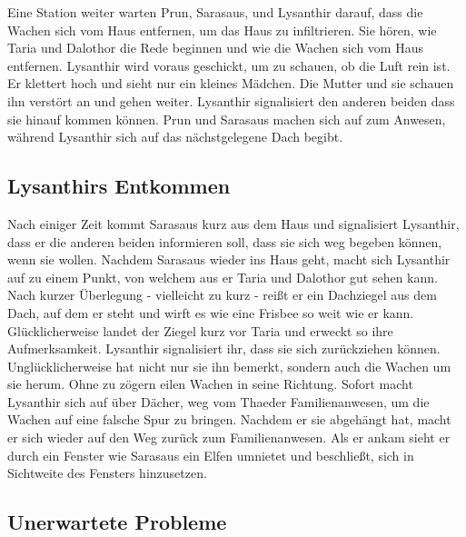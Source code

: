 \documentclass[10pt,twoside,twocolumn,openany]{book}
\begin{document}
	Eine Station weiter warten Prun, Sarasaus, und Lysanthir darauf, dass die Wachen sich vom Haus entfernen, um das Haus zu infiltrieren. Sie hören, wie Taria und Dalothor die Rede beginnen und wie die Wachen sich vom Haus entfernen. Lysanthir wird voraus geschickt, um zu schauen, ob die Luft rein ist. Er klettert hoch und sieht nur ein kleines Mädchen. Die Mutter und sie schauen ihn verstört an und gehen weiter. Lysanthir signalisiert den anderen beiden dass sie hinauf kommen können. Prun und Sarasaus machen sich auf zum Anwesen, während Lysanthir sich auf das nächstgelegene Dach begibt. 
	
	\subsection{Lysanthirs Entkommen}
	
	Nach einiger Zeit kommt Sarasaus kurz aus dem Haus und signalisiert Lysanthir, dass er die anderen beiden informieren soll, dass sie sich weg begeben können, wenn sie wollen. Nachdem Sarasaus wieder ins Haus geht, macht sich Lysanthir auf zu einem Punkt, von welchem aus er Taria und Dalothor gut sehen kann. Nach kurzer Überlegung - vielleicht zu kurz - reißt er ein Dachziegel aus dem Dach, auf dem er steht und wirft es wie eine Frisbee so weit wie er kann. Glücklicherweise landet der Ziegel kurz vor Taria und erweckt so ihre Aufmerksamkeit. Lysanthir signalisiert ihr, dass sie sich zurückziehen können. Unglücklicherweise hat nicht nur sie ihn bemerkt, sondern auch die Wachen um sie herum. Ohne zu zögern eilen Wachen in seine Richtung. Sofort macht Lysanthir sich auf über Dächer, weg vom Thaeder Familienanwesen, um die Wachen auf eine falsche Spur zu bringen. Nachdem er sie abgehängt hat, macht er sich wieder auf den Weg zurück zum Familienanwesen. Als er ankam sieht er durch ein Fenster wie Sarasaus ein Elfen  umnietet und beschließt, sich in Sichtweite des Fensters hinzusetzen.
	
	\subsection{Unerwartete Probleme}
	
\end{document}
